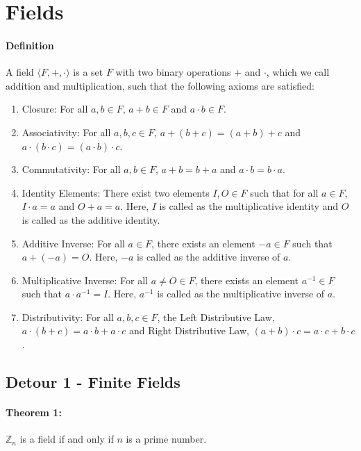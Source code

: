 \documentclass[12pt, oneside]{book}
\begin{document}
\section{Fields}
\paragraph{Definition} A field \( \langle F, +, \cdot \rangle \) is a set \( F \) with two binary operations \( + \) and \( \cdot \), which we call addition and multiplication, such that the following axioms are satisfied:
\begin{enumerate}
    \item Closure: For all \( a, b \in F \), \( a + b \in F \) and \( a \cdot b \in F \).
    \item Associativity: For all \( a, b, c \in F \), \( a + (b + c) = (a + b) + c \) and \( a \cdot (b \cdot c) = (a \cdot b) \cdot c \).
    \item Commutativity: For all \( a, b \in F \), \( a + b = b + a \) and \( a \cdot b = b \cdot a \).
    \item Identity Elements: There exist two elements \(I, O \in F\) such that for all \( a \in F \), \(I \cdot a = a \) and \( O + a = a \). Here, \( I \) is called as the multiplicative identity and \( O \) is called as the additive identity.
    \item Additive Inverse: For all \( a \in F \), there exists an element \( -a \in F \) such that \( a + (-a) = O \). Here, \( -a \) is called as the additive inverse of \( a \).
    \item Multiplicative Inverse: For all \( a \neq O \in F \), there exists an element \( a^{-1} \in F \) such that \( a \cdot a^{-1} = I \). Here, \( a^{-1} \) is called as the multiplicative inverse of \( a \).
    \item Distributivity: For all \( a, b, c \in F \), the Left Distributive Law, \( a \cdot (b + c) = a \cdot b + a \cdot c \) and Right Distributive Law, \( (a + b) \cdot c = a \cdot c + b \cdot c \).
\end{enumerate}
\subsection{Detour 1 - Finite Fields}
\paragraph{Theorem 1:} \( \mathbb{Z}_n \) is a field if and only if \( n \) is a prime number.
\end{document}
